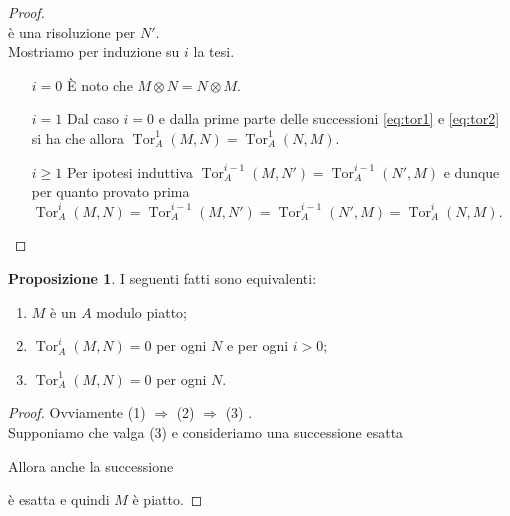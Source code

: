\documentclass[a4paper,11pt,oneside]{book}
\DeclareMathOperator{\Tor}{Tor}
\theoremstyle{definition}
\newtheorem{prop}{Proposizione}
\begin{document}
\begin{proof}
\[       \]
       \`e una risoluzione per $N'$. \\
       Mostriamo per induzione su $i$ la tesi.
      \begin{itemize}
       \item [$i=0$] È noto che $M \otimes N= N\otimes M$.
       \item [$i=1$] Dal caso $i=0$ e dalla prime parte delle successioni 
		      \ref{eq:tor1} e \ref{eq:tor2} si ha che allora $\Tor_A^1(M,N)=\Tor_A^1(N,M)$.
       \item [$i\geq 1$]Per ipotesi induttiva $\Tor_A^{i-1}(M,N')=\Tor_A^{i-1}(N',M)$ e dunque per quanto
	      provato prima $\Tor_A^i(M,N)=\Tor_A^{i-1}(M,N')=\Tor_A^{i-1}(N',M)=\Tor_A^i(N,M)$.
      \end{itemize}
 \end{proof}
 \begin{prop}\label{prop:piattotor}
  I seguenti fatti sono equivalenti:
  \begin{enumerate}[(1)]
   \item $M$ è un $A$ modulo piatto;
   \item $\Tor_A^i(M,N)=0$ per ogni $N$ e per ogni $i>0$;
   \item $\Tor_A^1(M,N)=0$ per ogni $N$.
  \end{enumerate}
 \end{prop}
 \begin{proof}
  Ovviamente (1) $\Rightarrow$ (2) $\Rightarrow$ (3) .\\
  Supponiamo che valga (3) e consideriamo una successione esatta
      \begin{center}
      \end{center} 
   Allora anche la successione 
   \begin{center}
      \end{center} 
    è esatta e quindi $M$ è piatto.
 \end{proof}
\end{document}
